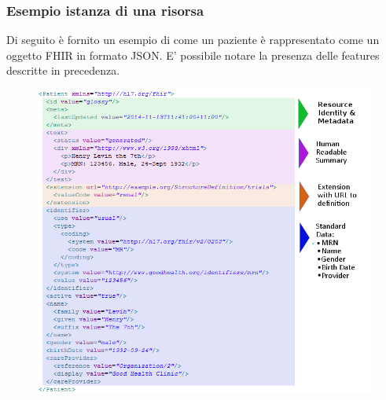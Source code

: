 \documentclass{article}
\begin{document}
\subsubsection{Esempio istanza di una risorsa}
Di seguito è fornito un esempio di come un paziente è rappresentato come un oggetto FHIR in formato JSON.
E' possibile notare la presenza delle features descritte in precedenza.
\begin{figure}[H]
    \centering
    \includegraphics[width=1 \textwidth]{figures/esempio paziente.png}
    \label{fig:esempioPaziente}
\end{figure}
\end{document}
